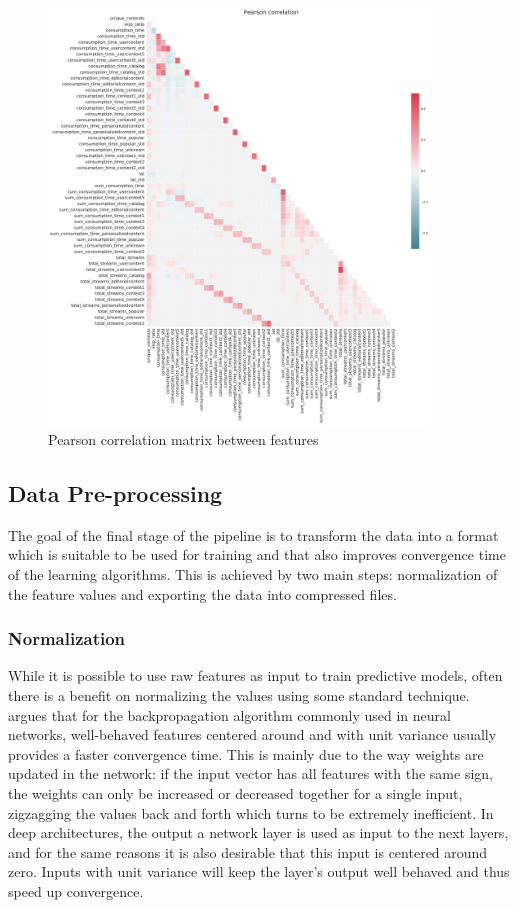 \documentclass{kththesis}
\begin{document}
	\begin{figure}[h]
    \centering
    \includegraphics[width=0.9\textwidth,height=0.9\textheight,keepaspectratio]{figures/corr.pdf}
    \caption{Pearson correlation matrix between features}
    \label{fig:correlation}
\end{figure}

\subsection{Data Pre-processing}

The goal of the final stage of the pipeline is to transform the data into a format which is suitable to be used for training and that also improves convergence time of the learning algorithms. This is achieved by two main steps: normalization of the feature values and exporting the data into compressed files.

\subsubsection{Normalization}

While it is possible to use raw features as input to train predictive models, often there is a benefit on normalizing the values using some standard technique. \citep{lecun2012efficient} argues that for the backpropagation algorithm commonly used in neural networks, well-behaved features centered around and with unit variance usually provides a faster convergence time. This is mainly due to the way weights are updated in the network: if the input vector has all features with the same sign, the weights can only be increased or decreased together for a single input, zigzagging the values back and forth which turns to be extremely inefficient. In deep architectures, the output a network layer is used as input to the next layers, and for the same reasons it is also desirable that this input is centered around zero. Inputs with unit variance will keep the layer's output well behaved and thus speed up convergence.
\end{document}
